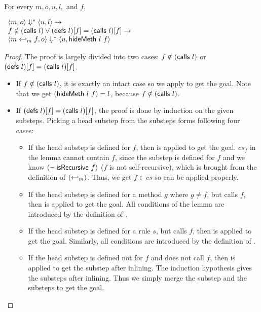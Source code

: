 \begin{lemma}
  \label{lem-inlinedmm}
  \mbox{}\\
  For every $m, o, u, l,$ and $f,$
  \begin{center}
    \begin{math}
      \begin{array}{l}
        \langle m, o \rangle \Downarrow^{\ast} \langle u, l \rangle \to \\
        f \notin (\textsf{calls}\ l) \vee (\textsf{defs}\ l)[f] = (\textsf{calls}\ l)[f] \to \\
        \langle m \hookleftarrow_{m}{} f, o \rangle \Downarrow^{\ast} \langle u, \textsf{hideMeth}{}\ l\ f \rangle
      \end{array}
    \end{math}
  \end{center}
\end{lemma}
\begin{proof}
  The proof is largely divided into two cases: $f \notin
  (\textsf{calls}\ l)$ or $(\textsf{defs}\ l)[f] = (\textsf{calls}\ l)[f]$.
  \begin{itemize}
  \item If $f \notin (\textsf{calls}\ l)$, it is exactly an intact case so
    we apply  to get the goal. Note that
    we get $(\textsf{hideMeth}{}\ l\ f) = l$, because $f \notin (\textsf{calls}\ l)$.
  \item If $(\textsf{defs}\ l)[f] = (\textsf{calls}\ l)[f]$, the proof is done by
    induction on the given substeps. Picking a head substep from the
    substeps forms following four cases:
    \begin{itemize}
    \item If the head substep is defined for $f$, then
       is applied to get the goal. $cs_f$
      in the lemma cannot contain $f$, since the substep is defined
      for $f$ and we know $(\neg\; \textsf{isRecursive}\ f)$ ($f$ is not
      self-recursive), which is brought from the definition of
      $(\hookleftarrow_{m})$.  Thus, we get $f \in cs$ so
       can be applied properly.
    \item If the head substep is defined for a method $g$ where $g
      \neq f$, but calls $f$, then  is
      applied to get the goal. All conditions of the lemma are
      introduced by the definition of \Substeps{}.
    \item If the head substep is defined for a rule $s$, but calls
      $f$, then  is applied to get the
      goal. Similarly, all conditions are introduced by the definition
      of \Substeps{}.
    \item If the head substep is defined not for $f$ and does not call
      $f$, then  is applied to
      get the substep after inlining. The induction hypothesis gives
      the substeps after inlining. Thus we simply merge the substep
      and the substeps to get the goal.
    \end{itemize}
  \end{itemize}
\end{proof}


